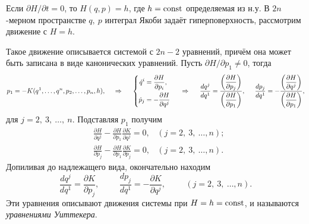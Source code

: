 Если $\partial H / \partial t = 0$, то $H(q, p) = h$, где $h = \text{const}$ определяемая из н.у. В $2n$-мерном пространстве $q, \ p$ интеграл Якоби задаёт гиперповерхность, рассмотрим движение с $H = h$.

Такое движение описывается системой с $2n-2$ уравнений, причём она может быть записана в виде канонических уравнений. Пусть $\partial H / \partial p_1 \neq 0$, тогда
\begin{equation*}
    p_1 = - K(q^1, \ldots, q^n, p_2, \ldots, p_n, h),
    \hspace{0.5cm} \Rightarrow \hspace{0.5cm} 
    \left\{\begin{aligned}
        \dot{q}^i &= \frac{\partial H}{\partial p_i}, \\
        \dot{p}_j &= - \frac{\partial H}{\partial q^j}        
    \end{aligned}\right.
    \hspace{0.5cm} \Rightarrow \hspace{0.5cm} 
    \frac{d q^j}{d q^1} = \frac{
    \left(\dfrac{\partial H}{\partial p_j} \right)
    }{
    \left(\dfrac{\partial H}{\partial p_1} \right)
    },
    \hspace{0.5cm} 
    \frac{d p_j}{d q^1} = - \frac{
    \left(\dfrac{\partial H}{\partial q^j}\right)
    }{
    \left(\dfrac{\partial H}{\partial p_1} \right)
    },
\end{equation*}
для $j = 2,\ 3,\ \ldots,\ n$. Подставляя $p_1$ получим
\begin{align*}
    &\frac{\partial H}{\partial q^j} - \frac{\partial H}{\partial p_1} \frac{\partial K}{\partial q^j} = 0,
    &(j = 2, \ 3, \ \ldots, n);
    \\
    &\frac{\partial H}{\partial p_j} - \frac{\partial H}{\partial p_1} \frac{\partial K}{\partial p_j}  = 0,
    &(j = 2, \ 3, \ \ldots, n).
\end{align*}
Допиливая до надлежащего вида, окончательно находим
\begin{equation*}
    \frac{d q^j}{d q^1} = \frac{\partial K}{\partial p_j},
    \hspace{1cm} 
    \frac{d p_j}{d q^1} = - \frac{\partial K}{\partial q^j},
    \hspace{1cm} 
    (j = 2, \ 3, \ \ldots, n).
\end{equation*}
Эти уравнения описывают движения системы при $H = h = \text{const}$, и называются \textit{уравнениями Уиттекера}. 


